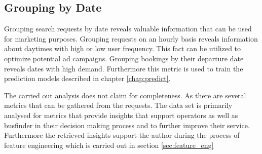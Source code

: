 \subsection{Grouping by Date}
Grouping search requests by date reveals valuable information that can be used for marketing purposes. Grouping requests on an hourly basis reveals information about daytimes with high or low user frequency. This fact can be utilized to optimize potential ad campaigns. Grouping bookings by their departure date reveals dates with high demand. Furthermore this metric is used to train the prediction models described in chapter \ref{chap:predict}. \newline


The carried out analysis does not claim for completeness. As there are several metrics that can be gathered from the requests. The data set is primarily analysed for metrics that provide insights that support operators as well as busfinder in their decision making process and to further improve their service. Furthermore the retrieved insights support the author during the process of feature engineering which is carried out in section \ref{sec:feature_eng}







